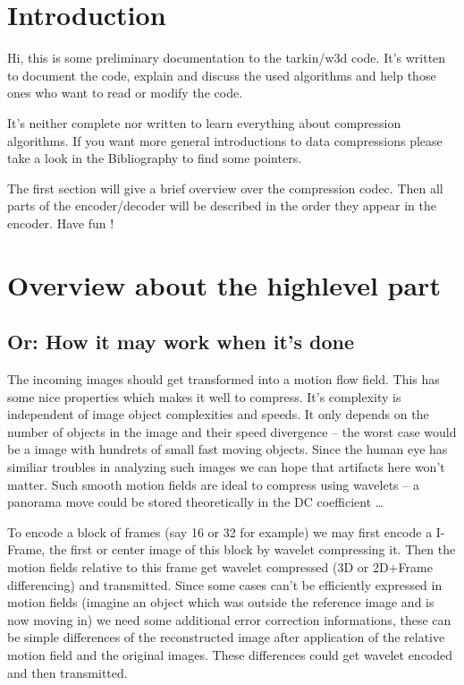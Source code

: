 \section{ Introduction }

Hi, this is some preliminary documentation to the tarkin/w3d code. It's written
to document the code, explain and discuss the used algorithms and help those 
ones who want to read or modify the code.

It's neither complete nor written to learn everything about compression 
algorithms. If you want more general introductions to data compressions please 
take a look in the Bibliography to find some pointers.

The first section will give a brief overview over the compression codec.
Then all parts of the encoder/decoder will be described in the order they appear
in the encoder. Have fun !


\section{ Overview about the highlevel part }
\subsection{ Or: How it may work when it's done }

The incoming images should get transformed into a motion flow field. This
has some nice properties which makes it well to compress. It's
complexity is independent of image object complexities and speeds. It only
depends on the number of objects in the image and their speed divergence -- 
the worst case would be a image with hundrets of small fast moving objects. 
Since the human eye has similiar troubles in analyzing such images we 
can hope that artifacts here won't matter.
Such smooth motion fields are ideal to compress using wavelets -- a panorama
move could be stored theoretically in the DC coefficient \dots
 
To encode a block of frames (say 16 or 32 for example) we may first encode
a I-Frame, the first or center image of this block by wavelet compressing it.
Then the motion fields relative to this frame get wavelet compressed (3D or
2D+Frame differencing) and transmitted. Since some cases can't be 
efficiently expressed in motion fields (imagine an object which was outside the
reference image and is now moving in) we need some additional error correction
informations, these can be simple differences of the reconstructed image after
application of the relative motion field and the original images. These 
differences could get wavelet encoded and then transmitted.

